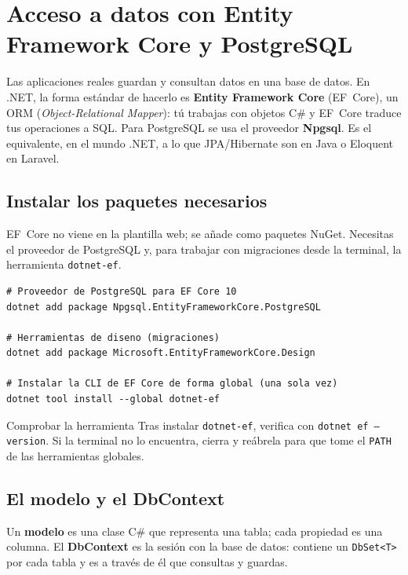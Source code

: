 \documentclass[11pt]{article}
\begin{document}
\section{Acceso a datos con Entity Framework Core y PostgreSQL}
Las aplicaciones reales guardan y consultan datos en una base de datos. En .NET, la forma estándar de hacerlo es \textbf{Entity Framework Core} (EF~Core), un ORM (\emph{Object-Relational Mapper}): tú trabajas con objetos C\# y EF~Core traduce tus operaciones a SQL. Para PostgreSQL se usa el proveedor \textbf{Npgsql}. Es el equivalente, en el mundo .NET, a lo que JPA/Hibernate son en Java o Eloquent en Laravel.

\subsection{Instalar los paquetes necesarios}
EF~Core no viene en la plantilla web; se añade como paquetes NuGet. Necesitas el proveedor de PostgreSQL y, para trabajar con migraciones desde la terminal, la herramienta \texttt{dotnet-ef}.

\begin{cajacodigo}
\begin{lstlisting}[style=shell]
# Proveedor de PostgreSQL para EF Core 10
dotnet add package Npgsql.EntityFrameworkCore.PostgreSQL

# Herramientas de diseno (migraciones)
dotnet add package Microsoft.EntityFrameworkCore.Design

# Instalar la CLI de EF Core de forma global (una sola vez)
dotnet tool install --global dotnet-ef
\end{lstlisting}
\end{cajacodigo}
\vspace{2pt}
\begin{cajatip}{Comprobar la herramienta}
Tras instalar \texttt{dotnet-ef}, verifica con \texttt{dotnet ef --version}. Si la terminal no lo encuentra, cierra y reábrela para que tome el \texttt{PATH} de las herramientas globales.\par
\end{cajatip}

\subsection{El modelo y el DbContext}
Un \textbf{modelo} es una clase C\# que representa una tabla; cada propiedad es una columna. El \textbf{DbContext} es la sesión con la base de datos: contiene un \texttt{DbSet<T>} por cada tabla y es a través de él que consultas y guardas.
\end{document}
